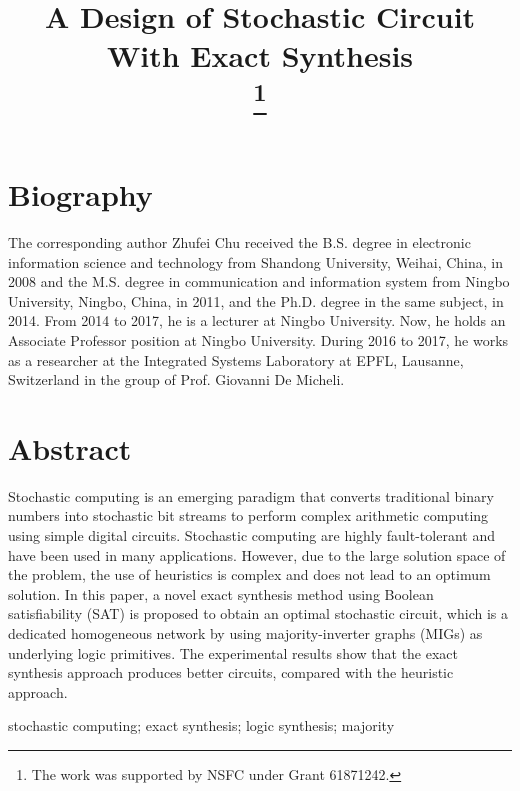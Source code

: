 \documentclass[conference,letterpaper]{IEEEtran}
\begin{document}
\title{A Design of Stochastic Circuit With Exact Synthesis\\
\thanks{The work was supported by NSFC under Grant 61871242.}
}

\author{
}

\maketitle

\section*{\textbf{Biography}}
The corresponding author Zhufei Chu received the B.S. degree in electronic information science and technology from Shandong University, Weihai, China, in 2008 and the M.S. degree in communication and information system from Ningbo University, Ningbo, China, in 2011, and the Ph.D. degree in the same subject, in 2014. From 2014 to 2017, he is a lecturer at Ningbo University. Now, he holds an Associate Professor position at Ningbo University. During 2016 to 2017, he works as a researcher at the Integrated Systems Laboratory at EPFL, Lausanne, Switzerland in the group of Prof. Giovanni De Micheli.

\section*{\textbf{Abstract}}
Stochastic computing is an emerging paradigm that converts traditional binary numbers into stochastic bit streams to perform complex arithmetic computing using simple digital circuits. Stochastic computing are highly fault-tolerant and have been used in many applications. However, due to the large solution space of the problem, the use of heuristics is complex and does not lead to an optimum solution. In this paper, a novel exact synthesis method using Boolean satisfiability (SAT) is proposed to obtain an optimal stochastic circuit, which is a dedicated homogeneous network by using majority-inverter graphs (MIGs) as underlying logic primitives. The experimental results show that the exact synthesis approach produces better circuits, compared with the heuristic approach.  
\vspace{2ex}

\begin{IEEEkeywords}
stochastic computing; exact synthesis; logic synthesis; majority
\end{IEEEkeywords}
\end{document}
